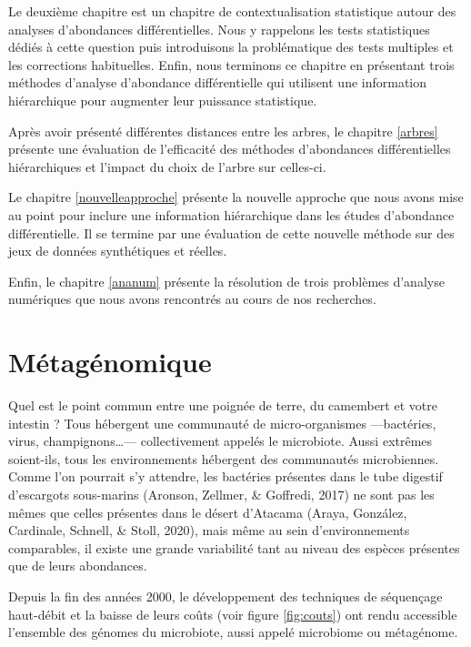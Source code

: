 \documentclass[12pt,a4paper]{reedthesis}
\theoremstyle{definition}
\theoremstyle{definition}
\theoremstyle{definition}
\theoremstyle{remark}
\begin{document}
Le deuxième chapitre est un chapitre de contextualisation statistique autour des analyses d'abondances différentielles. Nous y rappelons les tests statistiques dédiés à cette question puis introduisons la problématique des tests multiples et les corrections habituelles. Enfin, nous terminons ce chapitre en présentant trois méthodes d'analyse d'abondance différentielle qui utilisent une information hiérarchique pour augmenter leur puissance statistique.

Après avoir présenté différentes distances entre les arbres, le chapitre \ref{arbres} présente une évaluation de l'efficacité des méthodes d'abondances différentielles hiérarchiques et l'impact du choix de l'arbre sur celles-ci.

Le chapitre \ref{nouvelleapproche} présente la nouvelle approche que nous avons mise au point pour inclure une information hiérarchique dans les études d'abondance différentielle. Il se termine par une évaluation de cette nouvelle méthode sur des jeux de données synthétiques et réelles.

Enfin, le chapitre \ref{ananum} présente la résolution de trois problèmes d'analyse numériques que nous avons rencontrés au cours de nos recherches.

\hypertarget{metagenomique}{%
\chapter{Métagénomique}\label{metagenomique}}

Quel est le point commun entre une poignée de terre, du camembert et votre intestin ? Tous hébergent une communauté de micro-organismes ---bactéries, virus, champignons\ldots--- collectivement appelés le microbiote. Aussi extrêmes soient-ils, tous les environnements hébergent des communautés microbiennes. Comme l'on pourrait s'y attendre, les bactéries présentes dans le tube digestif d'escargots sous-marins (Aronson, Zellmer, \& Goffredi, 2017) ne sont pas les mêmes que celles présentes dans le désert d'Atacama (Araya, González, Cardinale, Schnell, \& Stoll, 2020), mais même au sein d'environnements comparables, il existe une grande variabilité tant au niveau des espèces présentes que de leurs abondances.

Depuis la fin des années 2000, le développement des techniques de séquençage haut-débit et la baisse de leurs coûts (voir figure \ref{fig:couts}) ont rendu accessible l'ensemble des génomes du microbiote, aussi appelé microbiome ou métagénome.
\end{document}
